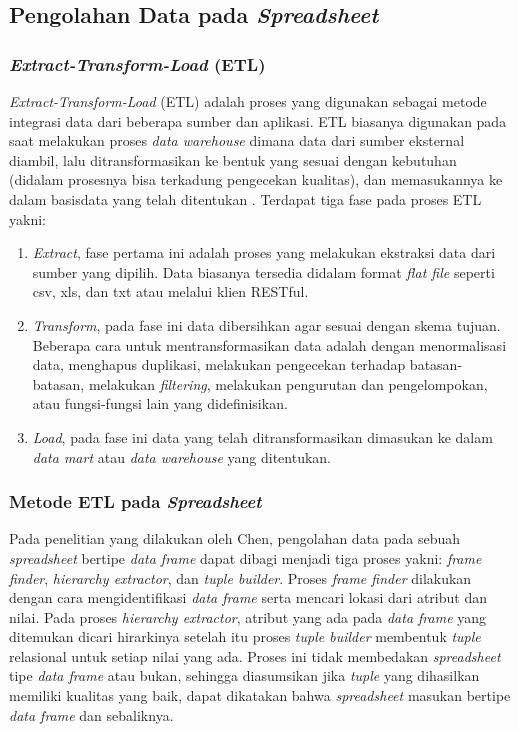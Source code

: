 \subsection{Pengolahan Data pada \textit{Spreadsheet}}
    \subsubsection{\textit{Extract-Transform-Load} (ETL)}
    \textit{Extract-Transform-Load} (ETL) adalah proses yang digunakan sebagai metode integrasi data dari beberapa sumber dan aplikasi. ETL biasanya digunakan pada saat melakukan proses \textit{data warehouse} dimana data dari sumber eksternal diambil, lalu ditransformasikan ke bentuk yang sesuai dengan kebutuhan (didalam prosesnya bisa terkadung pengecekan kualitas), dan memasukannya ke dalam basisdata yang telah ditentukan \parencite{Bansal2014}. Terdapat tiga fase pada proses ETL yakni:

    \begin{enumerate}
        \item \textit{Extract}, fase pertama ini adalah proses yang melakukan ekstraksi data dari sumber yang dipilih. Data biasanya tersedia didalam format \textit{flat file} seperti csv, xls, dan txt atau melalui klien RESTful.
        \item \textit{Transform}, pada fase ini data dibersihkan agar sesuai dengan skema tujuan. Beberapa cara untuk mentransformasikan data adalah dengan menormalisasi data, menghapus duplikasi, melakukan pengecekan terhadap batasan-batasan, melakukan \textit{filtering}, melakukan pengurutan dan pengelompokan, atau fungsi-fungsi lain yang didefinisikan.
        \item \textit{Load}, pada fase ini data yang telah ditransformasikan dimasukan ke dalam \textit{data mart} atau \textit{data warehouse} yang ditentukan.
    \end{enumerate}

    \subsubsection{Metode ETL pada \textit{Spreadsheet}} \label{Metode Pencarian}
    Pada penelitian yang dilakukan oleh Chen, pengolahan data pada sebuah \textit{spreadsheet} bertipe \textit{data frame} dapat dibagi menjadi tiga proses yakni: \textit{frame finder}, \textit{hierarchy extractor}, dan \textit{tuple builder}. Proses \textit{frame finder} dilakukan dengan cara mengidentifikasi \textit{data frame} serta mencari lokasi dari atribut dan nilai. Pada proses \textit{hierarchy extractor}, atribut yang ada pada \textit{data frame} yang ditemukan dicari hirarkinya setelah itu proses \textit{tuple builder} membentuk \textit{tuple} relasional untuk setiap nilai yang ada. Proses ini tidak membedakan \textit{spreadsheet} tipe \textit{data frame} atau bukan, sehingga diasumsikan jika \textit{tuple} yang dihasilkan memiliki kualitas yang baik, dapat dikatakan bahwa \textit{spreadsheet} masukan bertipe \textit{data frame} dan sebaliknya. \parencite{Chen2013}

